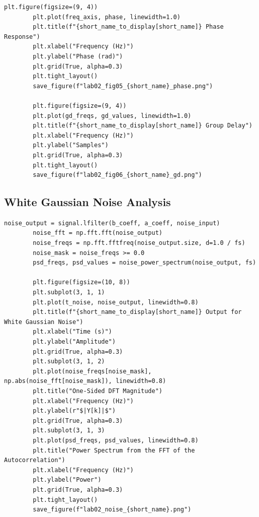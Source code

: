 \documentclass[12pt, a4paper]{article}
\begin{document}
\begin{lstlisting}[caption={Loop that generates pole-zero, impulse, gain, phase, and group-delay figures.}, label={lst:lab02_plots}]
        plt.figure(figsize=(9, 4))
        plt.plot(freq_axis, phase, linewidth=1.0)
        plt.title(f"{short_name_to_display[short_name]} Phase Response")
        plt.xlabel("Frequency (Hz)")
        plt.ylabel("Phase (rad)")
        plt.grid(True, alpha=0.3)
        plt.tight_layout()
        save_figure(f"lab02_fig05_{short_name}_phase.png")

        plt.figure(figsize=(9, 4))
        plt.plot(gd_freqs, gd_values, linewidth=1.0)
        plt.title(f"{short_name_to_display[short_name]} Group Delay")
        plt.xlabel("Frequency (Hz)")
        plt.ylabel("Samples")
        plt.grid(True, alpha=0.3)
        plt.tight_layout()
        save_figure(f"lab02_fig06_{short_name}_gd.png")
\end{lstlisting}

\subsection{White Gaussian Noise Analysis}
\begin{lstlisting}[caption={Noise-input analysis for all eight Lab 02 filters.}, label={lst:lab02_noise}]
        noise_output = signal.lfilter(b_coeff, a_coeff, noise_input)
        noise_fft = np.fft.fft(noise_output)
        noise_freqs = np.fft.fftfreq(noise_output.size, d=1.0 / fs)
        noise_mask = noise_freqs >= 0.0
        psd_freqs, psd_values = noise_power_spectrum(noise_output, fs)

        plt.figure(figsize=(10, 8))
        plt.subplot(3, 1, 1)
        plt.plot(t_noise, noise_output, linewidth=0.8)
        plt.title(f"{short_name_to_display[short_name]} Output for White Gaussian Noise")
        plt.xlabel("Time (s)")
        plt.ylabel("Amplitude")
        plt.grid(True, alpha=0.3)
        plt.subplot(3, 1, 2)
        plt.plot(noise_freqs[noise_mask], np.abs(noise_fft[noise_mask]), linewidth=0.8)
        plt.title("One-Sided DFT Magnitude")
        plt.xlabel("Frequency (Hz)")
        plt.ylabel(r"$|Y[k]|$")
        plt.grid(True, alpha=0.3)
        plt.subplot(3, 1, 3)
        plt.plot(psd_freqs, psd_values, linewidth=0.8)
        plt.title("Power Spectrum from the FFT of the Autocorrelation")
        plt.xlabel("Frequency (Hz)")
        plt.ylabel("Power")
        plt.grid(True, alpha=0.3)
        plt.tight_layout()
        save_figure(f"lab02_noise_{short_name}.png")
\end{lstlisting}
\end{document}

